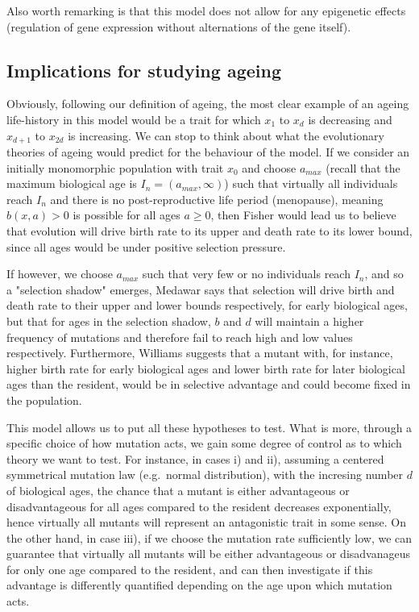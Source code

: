 \documentclass[11pt, a4paper]{article}
\theoremstyle{definition}
\begin{document}
Also worth remarking is that this model does not allow for any epigenetic effects (regulation of gene expression without alternations of the gene itself).

\subsection{Implications for studying ageing}
    Obviously, following our definition of ageing, the most clear example of an ageing life-history in this model would be a trait for which  $x_1$ to $x_d$ is decreasing and $x_{d+1}$ to $x_{2d}$ is increasing.
    We can stop to think about what the evolutionary theories of ageing would predict for the behaviour of the model. If we consider an initially monomorphic population with trait $x_0$ and choose $a_{max}$ (recall that the maximum biological age is $I_n = (a_{max},\infty)$) such that virtually all individuals reach $I_n$ and there is no post-reproductive life period (menopause), meaning $b(x,a) > 0$ is possible for all ages $a\geq 0$, then Fisher would lead us to believe that evolution will
    drive birth rate to its upper and death rate to its lower bound, since all ages would be under positive selection pressure. 
    
    If however, we choose $a_{max}$ such that very few or no individuals reach $I_n$, and so a "selection shadow" emerges, Medawar says that selection will drive birth and death rate to their upper and lower bounds respectively, for early biological ages, but that for ages in the selection shadow, $b$ and $d$ will maintain a higher frequency of mutations and therefore fail to reach high and low values respectively.
    Furthermore, Williams suggests that a mutant with, for instance, higher birth rate for early biological ages and lower birth rate for later biological ages than the resident, would be in selective advantage and could become fixed in the population.

    This model allows us to put all these hypotheses to test. What is more, through a specific choice of how mutation acts, we gain some degree of control as to which theory we want to test. For instance, in cases i) and ii), assuming a centered symmetrical mutation law (e.g.\ normal distribution), with the incresing number $d$ of biological ages, the chance that a mutant is either advantageous or disadvantageous for all ages compared to the resident decreases exponentially, hence virtually all mutants will represent an antagonistic trait in some sense. 
    On the other hand, in case iii), if we choose the mutation rate sufficiently low, we can guarantee that virtually all mutants will be either advantageous or disadvanageus for only one age compared to the resident, and can then investigate if this advantage is differently quantified depending on the age upon which mutation acts.
    
\end{document}
